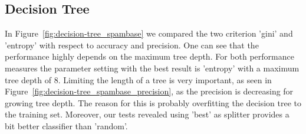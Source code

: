 \documentclass[a4paper,11pt]{article}
\begin{document}
    \subsection{Decision Tree}
        In Figure~\ref{fig:decision-tree_spambase} we compared the two criterion 'gini' and 'entropy' with respect to accuracy and precision. One can see that the performance highly depends on the maximum tree depth. For both performance measures the parameter setting with the best result is 'entropy' with a maximum tree depth of $8$. Limiting the length of a tree is very important, as seen in Figure~\ref{fig:decision-tree_spambase_precision}, as the precision is decreasing for growing tree depth. The reason for this is probably overfitting the decision tree to the training set. Moreover, our tests revealed using 'best' as splitter provides a bit better classifier than 'random'.
        
\end{document}
